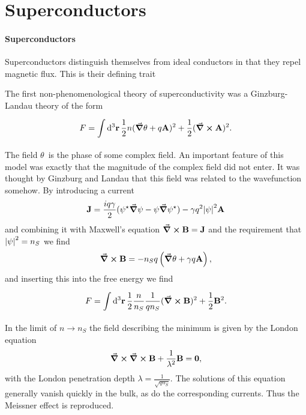 \section{Superconductors}

\paragraph{Superconductors}
Superconductors distinguish themselves from ideal conductors in that they repel magnetic flux. This is their defining trait

The first non-phenomenological theory of superconductivity was a Ginzburg-Landau theory of the form
\begin{align*}
	F = \int\limits_{}^{}\dd[3]{\vb{r}}\frac{1}{2}n(\grad{\theta} + q\vb{A})^{2} + \frac{1}{2}(\curl{\vb{A}})^{2}.
\end{align*}
The field $\theta$ is the phase of some complex field. An important feature of this model was exactly that the magnitude of the complex field did not enter. It was thought by Ginzburg and Landau that this field was related to the wavefunction somehow. By introducing a current
\begin{align*}
	\vb{J} = \frac{iq\gamma}{2}(\psi^{\star}\grad{\psi} - \psi\grad{\psi\ensuremath{^{\star}}}) - \gamma q^{2}\abs{\psi}^{2}\vb{A}
\end{align*}
and combining it with Maxwell's equation $\curl{\vb{B}} = \vb{J}$ and the requirement that $\abs{\psi}^{2} = n_{S}$ we find
\begin{align*}
	\curl{\vb{B}} = -n_{S}q\left(\grad{\theta} + \gamma q\vb{A}\right),
\end{align*}
and inserting this into the free energy we find
\begin{align*}
	F = \int\limits_{}^{}\dd[3]{\vb{r}}\frac{1}{2}\frac{n}{n_{S}}\frac{1}{qn_{S}}(\curl{\vb{B}})^{2} + \frac{1}{2}\vb{B}^{2}.
\end{align*}
In the limit of $n\to n_{S}$ the field describing the minimum is given by the London equation
\begin{align*}
	\curl{\curl{\vb{B}}} + \frac{1}{\lambda^{2}}\vb{B} = \vb{0},
\end{align*}
with the London penetration depth $\lambda = \frac{1}{\sqrt{qn_{S}}}$. The solutions of this equation generally vanish quickly in the bulk, as do the corresponding currents. Thus the Meissner effect is reproduced.

